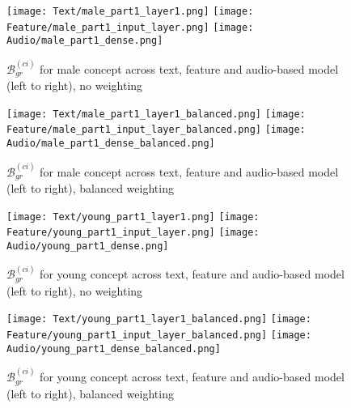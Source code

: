 \begin{figure}[H]
    \centering
    \begin{minipage}[t]{0.48\textwidth}
        \centering
        \texttt{[image: Text/male\_part1\_layer1.png]}
        \hfill
        \texttt{[image: Feature/male\_part1\_input\_layer.png]}
        \texttt{[image: Audio/male\_part1\_dense.png]}
        \caption{$\mathcal{B}^{(ci)}_{gr}$ for male concept across text, feature and audio-based model (left to right), no weighting}
        \label{fig:grad_male}
    \end{minipage}
    \hfill
    \begin{minipage}[t]{0.48\textwidth}
        \centering
        \texttt{[image: Text/male\_part1\_layer1\_balanced.png]}
        \hfill
        \texttt{[image: Feature/male\_part1\_input\_layer\_balanced.png]}
        \texttt{[image: Audio/male\_part1\_dense\_balanced.png]}
        \caption{$\mathcal{B}^{(ci)}_{gr}$ for male concept across text, feature and audio-based model (left to right), balanced weighting}
        \label{fig:grad_male_balanced}
    \end{minipage}
\end{figure}

\begin{figure}[H]
    \centering
    \begin{minipage}[t]{0.48\textwidth}
        \centering
        \texttt{[image: Text/young\_part1\_layer1.png]}
        \hfill
        \texttt{[image: Feature/young\_part1\_input\_layer.png]}
        \texttt{[image: Audio/young\_part1\_dense.png]}
        \caption{$\mathcal{B}^{(ci)}_{gr}$ for young concept across text, feature and audio-based model (left to right), no weighting}
        \label{fig:grad_young}
    \end{minipage}
    \hfill
    \begin{minipage}[t]{0.48\textwidth}
        \centering
        \texttt{[image: Text/young\_part1\_layer1\_balanced.png]}
        \hfill
        \texttt{[image: Feature/young\_part1\_input\_layer\_balanced.png]}
        \texttt{[image: Audio/young\_part1\_dense\_balanced.png]}
        \caption{$\mathcal{B}^{(ci)}_{gr}$ for young concept across text, feature and audio-based model (left to right), balanced weighting}
        \label{fig:grad_young_balanced}
    \end{minipage}
\end{figure}

